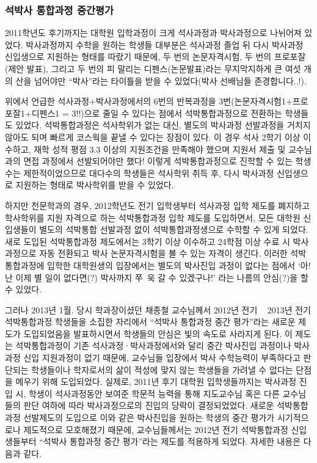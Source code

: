 \subsubsection{석박사 통합과정 중간평가}
2011학년도 후기까지는 대학원 입학과정이 크게 석사과정과 박사과정으로 나뉘어져
있었다.  박사과정까지 수학을 원하는 학생들 대부분은 석사과정 졸업 뒤 다시
박사과정 신입생으로 지원하는 형태를 따랐기 때문에, 두 번의 논문자격시험, 두 번의
프로포잘(제안 발표), 그리고 두 번의 피 말리는 디펜스(논문발표)라는 무지막지하게
큰 여섯 개의 산을 넘어야만 “박사”라는 타이틀을 받을 수 있었다(박사 선배님들
존경합니다..!).

위에서 언급한 석사과정+박사과정에서의 6번의 반복과정을
3번(논문자격시험1+프로포잘1+디펜스1 = 3!!)으로 줄일 수 있다는 점에서
석박통합과정으로 전환하는 학생들도 있었다.  석박통합과정은 석사학위가 없는 대신,
별도의 박사과정 선발과정을 거치지 않아도 되며 빠르게 코스웍을 끝낼 수 있다는
장점이 있다.  이 경우 석사 2학기 이상 이수하고, 재학 성적 평점 3.3 이상의
지원조건을 만족해야 했으며 지원서 제출 및 교수님과의 면접 과정에서 선발되어야만
했다!  이렇게 석박통합과정으로 진학할 수 있는 학생 수는 제한적이었으므로 대다수의
학생들은 석사학위 취득 후, 다시 박사과정 신입생으로 지원하는 형태로 박사학위를
받을 수 있었다.

하지만 천문학과의 경우, 2012학년도 전기 입학생부터 석사과정 입학 제도를 폐지하고
학사학위를 지원 자격으로 하는 석박통합과정 입학 제도를 도입하면서, 모든 대학원
신입생들이 별도의 석박통합 선발과정 없이 석박통합과정생으로 수학할 수 있게
되었다.  새로 도입된 석박통합과정 제도에서는 3학기 이상 이수하고 24학점 이상 수료
시 박사과정으로 자동 전환되고 박사 논문자격시험을 볼 수 있는 자격이 생긴다.
이러한 석박통합과정에 입학한 대학원생의 입장에서는 별도의 박사진입 과정이 없다는
점에서 ‘아! 난 이제 별 일이 없다면(?) 박사까지 쭈~욱 갈 수 있겠구나!’ 라는 나름의
안심(?)을 할 수 있었다.

그러나 2013년 1월. 당시 학과장이셨던 채종철 교수님께서 2012년 전기 ~ 2013년 전기
석박통합과정 학생들을 소집한 자리에서 “석박사 통합과정 중간 평가”라는 새로운
제도가 도입되었음을 발표하시면서 학생들의 안심은 빛의 속도로 사라지게 된다.  이
제도는 석박통합과정이 기존 석사과정·박사과정에서와 달리 중간 박사진입 과정이나
박사 과정 신입 지원과정이 없기 때문에, 교수님들 입장에서 박사 수학능력이
부족하다고 판단되는 학생들이나 학자로서의 삶이 적성에 맞지 않는 학생들을 가려낼
수 없다는 단점을 메우기 위해 도입되었다.  실제로, 2011년 후기 대학원
입학생들까지는 박사과정 진입 시, 학생이 석사과정동안 보여준 학문적 능력을 통해
지도교수님 혹은 다른 교수님들의 판단 여하에 따라 박사과정으로의 진입의 당락이
결정되었었다.  새로운 석박통합과정 선발제도의 도입으로 이와 같은 박사진입을
원하는 학생의 중간 평가가 시기적으로나 제도적으로 모호해졌기 때문에,
교수님들께서는 2012년 전기 석박통합과정 신입생들부터 “석박사 통합과정 중간
평가”라는 제도를 적용하게 되었다. 자세한 내용은 다음과 같다.

